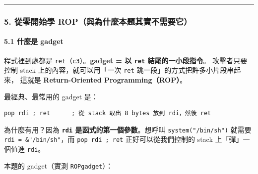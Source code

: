 \documentclass[10pt,a4paper]{article}
\newenvironment{Shaded}{\begin{snugshade}}{\end{snugshade}}
\newcommand{\AttributeTok}[1]{\textcolor[rgb]{0.13,0.29,0.53}{#1}}
\newcommand{\ExtensionTok}[1]{#1}
\newcommand{\FunctionTok}[1]{\textcolor[rgb]{0.13,0.29,0.53}{\textbf{#1}}}
\newcommand{\KeywordTok}[1]{\textcolor[rgb]{0.13,0.29,0.53}{\textbf{#1}}}
\newcommand{\NormalTok}[1]{#1}
\newcommand{\StringTok}[1]{\textcolor[rgb]{0.31,0.60,0.02}{#1}}
\renewenvironment{Shaded}{%
  \def\FrameCommand{\fboxsep=3.2pt\colorbox{shadecolor}}%
  \MakeFramed{\advance\hsize-\width\FrameRestore\small}%
}{%
  \endMakeFramed
}
\begin{document}
\begin{center}\rule{0.5\linewidth}{0.5pt}\end{center}

\subsubsection{5. 從零開始學
ROP（與為什麼本題其實不需要它）}\label{ux5f9eux96f6ux958bux59cbux5b78-ropux8207ux70baux4ec0ux9ebcux672cux984cux5176ux5be6ux4e0dux9700ux8981ux5b83}

\paragraph{5.1 什麼是 gadget}\label{ux4ec0ux9ebcux662f-gadget}

程式裡到處都是 \texttt{ret}（\texttt{c3}）。\textbf{gadget = 以
\texttt{ret} 結尾的一小段指令}。 攻擊者只要控制 stack
上的內容，就可以用「一次 \texttt{ret} 跳一段」的方式把許多小片段串起來，
這就是 \textbf{Return-Oriented Programming（ROP）}。

最經典、最常用的 gadget 是：

\begin{Verbatim}[breaklines=true,breakanywhere=true,breakautoindent=false,fontsize=\fontsize{7.0}{9.5}\selectfont]
pop rdi ; ret      ; 從 stack 取出 8 bytes 放到 rdi，然後 ret
\end{Verbatim}

為什麼有用？因為 \textbf{\texttt{rdi} 是函式的第一個參數}。想呼叫
\texttt{system("/\allowbreak{}bin/\allowbreak{}sh")} 就需要 \texttt{rdi\ \allowbreak{}=\ \allowbreak{}\&\allowbreak{}"/\allowbreak{}bin/\allowbreak{}sh"}，而
\texttt{pop\ \allowbreak{}rdi\ \allowbreak{};\ \allowbreak{}ret} 正好可以從我們控制的 stack 上「彈」一個值進
\texttt{rdi}。

本題的 gadget（實測 \texttt{ROPgadget}）：

\begin{Shaded}
\end{Shaded}
\end{document}
